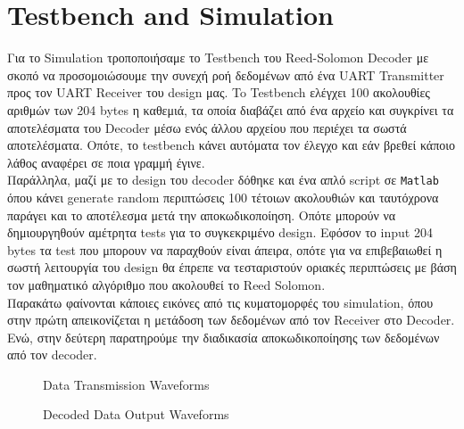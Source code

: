 \documentclass[12pt,a4paper]{article}
\begin{document}
    \section{\textcolor{PineGreen}{Testbench and Simulation}}
    Για το Simulation τροποποιήσαμε το Testbench του Reed-Solomon Decoder με σκοπό να προσομοιώσουμε την συνεχή ροή δεδομένων από ένα UART Transmitter προς τον UART Receiver του design μας. To Testbench ελέγχει 100 ακολουθίες αριθμών των 204 bytes η καθεμιά, τα οποία διαβάζει από ένα αρχείο και συγκρίνει τα αποτελέσματα του Decoder μέσω ενός άλλου αρχείου που περιέχει τα σωστά αποτελέσματα. Οπότε, το testbench κάνει αυτόματα τον έλεγχο και εάν βρεθεί κάποιο λάθος αναφέρει σε ποια γραμμή έγινε.\\
    Παράλληλα, μαζί με το design του decoder δόθηκε και ένα απλό script σε \verb|Matlab| όπου κάνει generate random περιπτώσεις 100 τέτοιων ακολουθιών και ταυτόχρονα παράγει και το αποτέλεσμα μετά την αποκωδικοποίηση. Οπότε μπορούν να δημιουργηθούν αμέτρητα tests για το συγκεκριμένο design. Εφόσον το input 204 bytes τα test που μπορουν να παραχθούν είναι άπειρα, οπότε για να επιβεβαιωθεί η σωστή λειτουργία του design θα έπρεπε να τεσταριστούν οριακές περιπτώσεις με βάση τον μαθηματικό αλγόριθμο που ακολουθεί το Reed Solomon. \\
    Παρακάτω φαίνονται κάποιες εικόνες από τις κυματομορφές του simulation, όπου στην πρώτη απεικονίζεται η μετάδοση των δεδομένων από τον Receiver στο Decoder. Ενώ, στην δεύτερη παρατηρούμε την διαδικασία αποκωδικοποίησης των δεδομένων από τον decoder.

    \begin{figure} [H]
     	\caption{Data Transmission Waveforms}
     	\label{Data Transmission Waveforms}
     \end{figure}
     
    \begin{figure} [H]
     	\caption{Decoded Data Output Waveforms}
     	\label{Decoded Data Output Waveforms}
     \end{figure}
\end{document}
